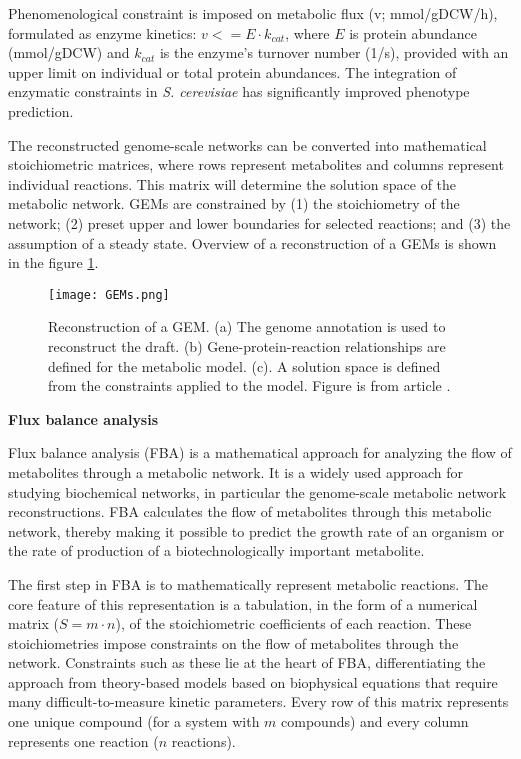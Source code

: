 Phenomenological constraint is imposed on metabolic flux (v; mmol/gDCW/h), formulated as enzyme
kinetics: $v <=  E \cdot k_{cat}$, where $E$ is protein abundance (mmol/gDCW) and $k_{cat}$ is the enzyme's turnover number (1/s),
provided with an upper limit on individual or total protein abundances. The integration of
enzymatic constraints in \textit{S. cerevisiae} has significantly improved phenotype prediction. \cite{Sanchez2017}

The reconstructed genome-scale networks can be converted into mathematical stoichiometric matrices, where rows represent metabolites 
and columns represent individual reactions. This matrix will
determine the solution space of the metabolic network. GEMs are constrained by (1) the stoichiometry of the
network; (2) preset upper and lower boundaries for selected reactions; and (3) the assumption of a steady state. \cite{Kerkhoven2014} 
Overview of a reconstruction of a GEMs is shown in the figure \ref{GEMs}.


\begin{figure}[h]
    \texttt{[image: GEMs.png]}
    \caption{Reconstruction of a GEM. (a) The genome annotation is used 
    to reconstruct the draft. (b) Gene-protein-reaction relationships are defined for the metabolic model. 
     (c). A solution space is defined from the constraints applied to the model. Figure is from article \cite{Kerkhoven2014}.}
    \label{GEMs}
\end{figure}




\textbf{Flux balance analysis}

Flux balance analysis (FBA) is a mathematical approach for analyzing the flow of metabolites through a metabolic network.
It is a widely used approach for studying biochemical networks, in particular the genome-scale metabolic network reconstructions. 
FBA calculates the flow of metabolites through this metabolic network, thereby making it possible to predict the growth rate of an 
organism or the rate of production of a biotechnologically important metabolite. 
\cite{Orth2010}

The first step in FBA is to mathematically represent metabolic reactions. 
The core feature of this representation is a tabulation, in the form of a numerical matrix ($S = m\cdot n$), 
of the stoichiometric coefficients of each reaction. These stoichiometries impose 
constraints on the flow of metabolites through the network. Constraints such as these lie at the heart of 
FBA, differentiating the approach from theory-based models based on biophysical equations that require many difficult-to-measure 
kinetic parameters. Every row of this matrix represents one unique compound (for a system with $m$ compounds) and every column 
represents one reaction ($n$ reactions). 

